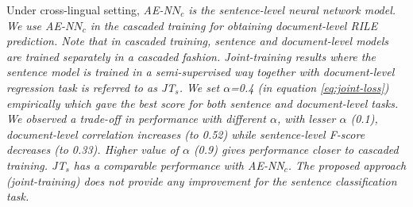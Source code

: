 \documentclass[11pt,a4paper]{article}
\begin{document}
Under cross-lingual setting, \em{AE-N$N_{c}$} \rm is the sentence-level neural network model. We use \em{AE-N$N_{c}$} \rm in the \textit{cascaded training} for obtaining document-level RILE prediction. Note that in \textit{cascaded training}, sentence and document-level models are trained separately in a cascaded fashion. Joint-training results where the sentence model is trained in a semi-supervised way together with document-level regression task is referred to as \em{JT$_{s}$}\rm. We set  $\alpha$=0.4 (in equation \ref{eq:joint-loss}) empirically which gave the best score for both sentence and document-level tasks. We observed a trade-off in performance with different $\alpha$, with lesser $\alpha$ (0.1), document-level correlation increases (to 0.52) while sentence-level F-score decreases (to 0.33). Higher value of $\alpha$ (0.9) gives performance closer to cascaded training. \em{JT$_{s}$} \rm has a comparable performance with \em{AE-NN$_{c}$}. \rm The proposed approach (joint-training) does not provide any improvement for the sentence classification task.
\end{document}
